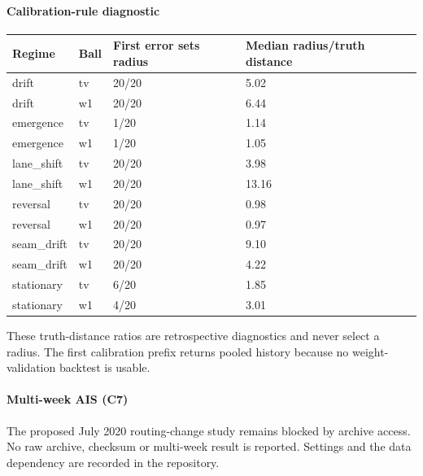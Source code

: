 \paragraph{Calibration-rule diagnostic}
\begin{center}\small\begin{tabular}{llll}
\toprule
Regime & Ball & First error sets radius & Median radius/truth distance\\\midrule
drift & tv & 20/20 & 5.02\\
drift & w1 & 20/20 & 6.44\\
emergence & tv & 1/20 & 1.14\\
emergence & w1 & 1/20 & 1.05\\
lane\_shift & tv & 20/20 & 3.98\\
lane\_shift & w1 & 20/20 & 13.16\\
reversal & tv & 20/20 & 0.98\\
reversal & w1 & 20/20 & 0.97\\
seam\_drift & tv & 20/20 & 9.10\\
seam\_drift & w1 & 20/20 & 4.22\\
stationary & tv & 6/20 & 1.85\\
stationary & w1 & 4/20 & 3.01\\
\bottomrule\end{tabular}\end{center}

These truth-distance ratios are retrospective diagnostics and never select a radius. The first calibration prefix returns pooled history because no weight-validation backtest is usable.

\paragraph{Multi-week AIS (C7)} The proposed July 2020 routing-change study remains blocked by archive access. No raw archive, checksum or multi-week result is reported. Settings and the data dependency are recorded in the repository.
